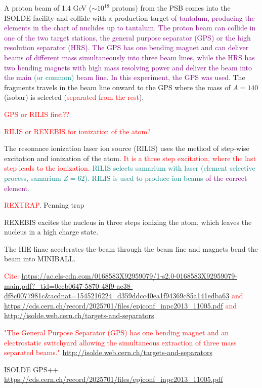 \documentclass[twoside,english]{uiofysmaster/uiofysmaster}
\begin{document}
A proton beam of 1.4 GeV ($\sim 10^{18}$ protons) from the PSB comes into the ISOLDE facility and collide with a production target \textcolor{purple}{of tantalum, producing the elements in the chart of nuclides up to tantalum. The proton beam can collide in one of the two target stations, the general purpose separator (GPS) or the high resolution separator (HRS). The GPS has one bending magnet and can deliver beams of different mass simultaneously into three beam lines, while the HRS has two bending magnets with high mass resolving power and deliver the beam into the main \textcolor{teal}{(or common)} beam line. In this experiment, the GPS was used.} The fragments travels in the beam line onward to the GPS where the mass of $A = 140$ (isobar) is selected (\textcolor{red}{separated from the rest}). 

\textcolor{red}{GPS or RILIS first??}

\textcolor{red}{RILIS or REXEBIS for ionization of the atom?} 

The resonance ionization laser ion source (RILIS) uses the method of step-wise excitation and ionization of the atom. \textcolor{red}{It is a three step excitation, where the last step leads to the ionization.}  \textcolor{teal}{RILIS selects samarium with laser (element selective process, samarium $Z = 62$). RILIS is used to produce ion beams \textcolor{purple}{of the correct element}.}

\textcolor{red}{REXTRAP}. Penning trap

REXEBIS excites the nucleus in three steps ionizing the atom, which leaves the nucleus in a high charge state. 

The HIE-linac accelerates the beam through the beam line and magnets bend the beam into MINIBALL. 

\textcolor{red}{Cite: \url{https://ac.els-cdn.com/0168583X92959079/1-s2.0-0168583X92959079-main.pdf?_tid=0ccb0647-5870-48f9-ac38-df8c0077981c&acdnat=1545216224_d359ddcc40ea1f94369c85a141edba63} and \url{https://cds.cern.ch/record/2025701/files/epjconf_inpc2013_11005.pdf} and \url{http://isolde.web.cern.ch/targets-and-separators}}

\bigskip

\textcolor{red}{"The General Purpose Separator (GPS) has one bending magnet and an electrostatic switchyard allowing the simultaneous extraction of three mass separated beams." \url{http://isolde.web.cern.ch/targets-and-separators}}

\bigskip

ISOLDE GPS++ \url{https://cds.cern.ch/record/2025701/files/epjconf_inpc2013_11005.pdf}
\end{document}
